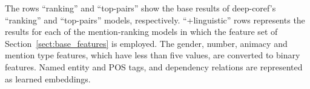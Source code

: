 \begin{table}[htbp]
    \begin{center}\footnotesize
    \end{center}
    \caption{Impact of linguistic features on deep-coref models on the CoNLL development set.
	}
    \label{tab:dev-linguistics}
\end{table}
The rows ``ranking'' and ``top-pairs'' show the base results of deep-coref's ``ranking'' and ``top-pairs'' models, respectively. 
``+linguistic'' rows represents the results for each of the mention-ranking models in which the feature set of Section~\ref{sect:base_features} is employed.
The gender, number, animacy and mention type features, which have less than five values, 
are converted to binary features. 
Named entity and POS tags, and dependency relations
are represented as learned embeddings.

